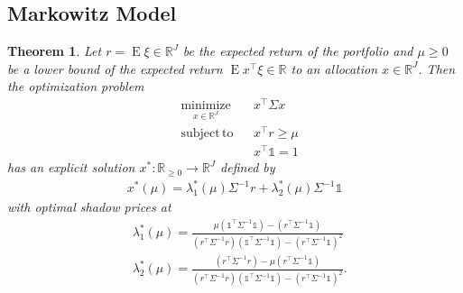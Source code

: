 \documentclass[a4paper, english, 11pt, onecolumn, oneside, final]{article}
\numberwithin{equation}{section}   %
\DeclareMathOperator{\E}{\mathrm{E}}	    %
\newcommand{\R}{\mathbb{R}}                 %
\newcommand{\one}{\mathds 1}
\newcommand{\precision}{\Sigma^{-1}}
\theoremstyle{plain}
\newtheorem{theorem}             {Theorem}[section]
\theoremstyle{definition}
\theoremstyle{remark}
\begin{document}
\subsection{Markowitz Model}
\begin{theorem}
    Let $r = \E\xi \in\R^J$ be the expected return of the portfolio and $\mu\geq0$ be a lower bound of the expected return $\E x^\top\xi\in\R$ to an allocation $x\in\R^J$. Then the optimization problem
    \begin{equation*}
        \begin{aligned}
            & \underset{x\in\R^J}{\mathrm{minimize}} & & x^\top\Sigma x \\
            & \mathrm{subject\,to} & & x^\top r \geq \mu \\
            & & & x^\top\one = 1
        \end{aligned}
    \end{equation*}
    has an explicit solution $x^*\colon\R_{\geq 0}\to\R^J$ defined by
    \begin{equation}
    \label{eq:markowitz-solution}
        \begin{aligned}
            x^*(\mu) = \lambda_1^*(\mu)\precision r + \lambda_2^*(\mu)\precision\one
        \end{aligned}
    \end{equation}
    with optimal shadow prices at
    \begin{equation*}
        \begin{aligned}
            & \lambda_1^*(\mu) = \frac{\mu(\one^\top\precision\one) - (r^\top\precision\one)}{(r^\top\precision r)(\one^\top\precision\one) - (r^\top\precision\one)^2}\\
            & \lambda_2^*(\mu) = \frac{(r^\top\precision r) - \mu(r^\top\precision\one)}{(r^\top\precision r)(\one^\top\precision\one) - (r^\top\precision\one)^2}.
        \end{aligned}
    \end{equation*}
\end{theorem}
\end{document}
